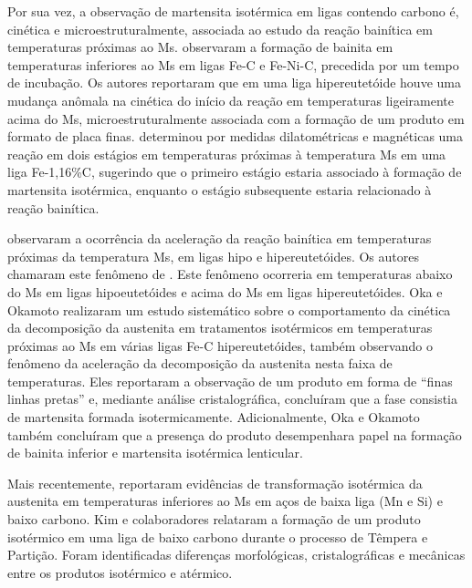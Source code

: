 Por sua vez, a observação de martensita isotérmica em ligas contendo carbono é, cinética e microestruturalmente, associada ao estudo da reação bainítica em temperaturas próximas ao Ms.  observaram a formação de bainita em temperaturas inferiores ao Ms em ligas Fe-C e Fe-Ni-C, precedida por um tempo de incubação. Os autores reportaram que em uma liga hipereutetóide houve uma mudança anômala na cinética do início da reação em temperaturas ligeiramente acima do Ms, microestruturalmente associada com a formação de um produto em formato de placa finas.  determinou por medidas dilatométricas e magnéticas uma reação em dois estágios em temperaturas próximas à temperatura Ms em uma liga Fe-1,16\%C, sugerindo que o primeiro estágio estaria associado à formação de martensita isotérmica, enquanto o estágio subsequente estaria relacionado à reação bainítica.

 observaram a ocorrência da aceleração da reação bainítica em temperaturas próximas da temperatura Ms, em ligas hipo e hipereutetóides. Os autores chamaram este fenômeno de . Este fenômeno ocorreria em temperaturas abaixo do Ms em ligas hipoeutetóides e acima do Ms em ligas hipereutetóides. Oka e Okamoto\cite{Okamoto1985,Oka1988} realizaram um estudo sistemático sobre o comportamento da cinética da decomposição da austenita em tratamentos isotérmicos em temperaturas próximas ao Ms em várias ligas Fe-C hipereutetóides, também observando o fenômeno da aceleração da decomposição da austenita nesta faixa de temperaturas. Eles reportaram a observação de um produto em forma de ``finas linhas pretas'' e, mediante análise cristalográfica, concluíram que a fase consistia de martensita formada isotermicamente. Adicionalmente, Oka e Okamoto também concluíram que a presença do produto desempenhara papel na formação de bainita inferior e martensita isotérmica lenticular.

Mais recentemente,  reportaram evidências de transformação isotérmica da austenita em temperaturas inferiores ao Ms em aços de baixa liga (Mn e Si) e baixo carbono. Kim e colaboradores\cite{Kim2010,Kim2012} relataram a formação de um produto isotérmico em uma liga de baixo carbono durante o processo de Têmpera e Partição. Foram identificadas diferenças morfológicas, cristalográficas e mecânicas entre os produtos isotérmico e atérmico.


